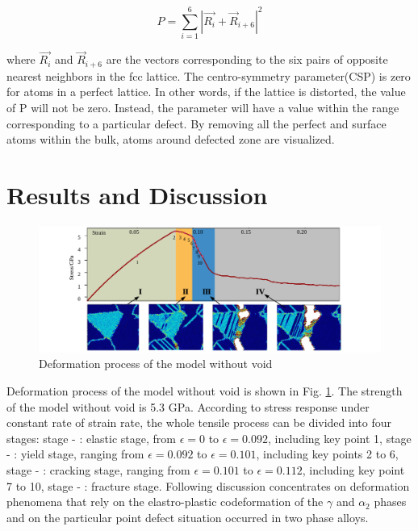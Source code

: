 \documentclass[materials,article,submit,moreauthors,pdftex,10pt,a4paper]{Definitions/mdpi}
\begin{document}
	\begin{equation} \label{eq:csp} 
	P = \displaystyle\sum_{i=1}^{6}|\vec{R_i}+{\vec{R}}_{i+6}|^2
	\end{equation}
	
where $\vec{R_i}$ and ${\vec{R}}_{i+6}$ are the vectors corresponding to the six pairs of opposite nearest neighbors in the fcc lattice. The centro-symmetry parameter(CSP) is zero for atoms in a perfect lattice. In other words, if the lattice is distorted, the value of P will not be zero. Instead, the parameter will have a value within the range corresponding to a particular defect. By removing all the perfect and surface atoms within the bulk, atoms around defected zone are visualized. 
 
\section{Results and Discussion}\label{section:RD}

\begin{figure}[ht]
	\centering
	\includegraphics[width=1\linewidth]{img/tens}
	\caption{Deformation process of the model without void}
	\label{fig:deformation-pf}
\end{figure}


Deformation process of the model without void is shown in Fig. \ref{fig:deformation-pf}. The strength of the model without void is 5.3 GPa. According to stress response under constant rate of strain rate, the whole tensile process can be divided into four stages: 
stage - \uppercase\expandafter{}: elastic stage, from $\epsilon = 0$ to $\epsilon = 0.092$, including key point 1,
stage - \uppercase\expandafter{}: yield stage, ranging from $\epsilon = 0.092$ to $\epsilon = 0.101$, including key points 2 to 6,
stage - \uppercase\expandafter{}: cracking stage, ranging from $\epsilon = 0.101$ to $\epsilon = 0.112$, including key point 7 to 10,
stage - \uppercase\expandafter{}: fracture stage. Following discussion concentrates on deformation phenomena that rely on the elastro-plastic codeformation of the $\gamma$ and $\alpha_2$ phases and on the particular point defect situation occurred in two phase alloys. 
\end{document}
